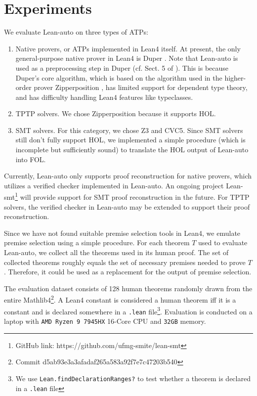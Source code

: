 \section{Experiments}\label{sectexpr}

  We evaluate Lean-auto on three types of ATPs:
  \begin{enumerate}
    \item Native provers, or ATPs implemented in Lean4 itself. At present, the only general-purpose
      native prover in Lean4 is Duper \cite{DuperPaper}. Note that Lean-auto is
      used as a preprocessing step in Duper (cf. Sect. 5 of \cite{DuperPaper}).
      This is because Duper's core algorithm, which is based on the algorithm used
      in the higher-order prover Zipperposition \cite{ZipperpositionMakeWork}, has limited support for dependent
      type theory, and has difficulty handling Lean4 features like typeclasses.
    \item TPTP solvers. We chose Zipperposition because it supports HOL.
    \item SMT solvers. For this category, we chose Z3 and CVC5. Since SMT solvers
      still don't fully support HOL, we implemented a simple procedure
      (which is incomplete but sufficiently sound) to translate the HOL output of Lean-auto into FOL.
  \end{enumerate}

  Currently, Lean-auto only supports proof reconstruction for native provers,
  which utilizes a verified checker implemented in Lean-auto. An
  ongoing project Lean-smt\footnote{GitHub link: https://github.com/ufmg-smite/lean-smt}
  will provide support for SMT proof reconstruction in the future. For TPTP solvers,
  the verified checker in Lean-auto may be extended to support their proof reconstruction.

  Since we have not found suitable premise selection tools in Lean4, we emulate
  premise selection using a simple procedure. For each theorem $T$ used to evaluate
  Lean-auto, we collect all the theorems used in its human proof. The set of collected theorems
  roughly equals the set of necessary premises needed to prove $T$. Therefore, it could
  be used as a replacement for the output of premise selection.

  The evaluation dataset consists of 128 human theorems randomly drawn from the entire
  Mathlib4\footnote{Commit d5ab93e3a3afadaf265a583a92f7e7c47203b540}. A
  Lean4 constant is considered a human theorem iff it is a constant and
  is declared somewhere in a \texttt{.lean} file\footnote{We use
  \texttt{Lean.findDeclarationRanges?} to test whether a theorem is
  declared in a \texttt{.lean} file}. Evaluation is conducted on a laptop
  with \texttt{AMD Ryzen 9 7945HX} 16-Core CPU and \texttt{32GB} memory.

